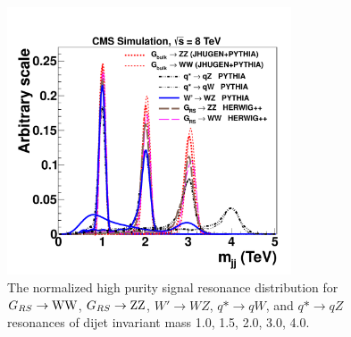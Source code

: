 \begin{figure}[htb]
\begin{center}
\includegraphics[width=0.75\textwidth]{figs/signal-acc-eff/resonance-shape.pdf}
\end{center}
\caption{The normalized high purity signal resonance distribution for  $G_{RS}\to {\mathrm{W}}{\mathrm{W}}$, $G_{RS}\to {\mathrm{Z}}{\mathrm{Z}}$, $W' \to WZ$, $q*\to qW$, and $q*\to qZ$ resonances of dijet invariant mass 1.0\TeVcc, 1.5\TeVcc, 2.0\TeVcc,  3.0\TeVcc, 4.0\TeVcc.
}
\label{fig:highsignalShapes}
\end{figure}







